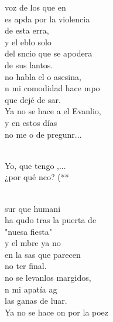 \documentclass[12pt]{article}
\begin{document}
\begin{multicols*}{2}
\begin{cancion}%
	 voz de los que en\\
	es apda por la violencia \\
	de esta erra,\\
	y el eblo solo \\
	del sncio que se apodera \\
	de sus lantos.\\
	no habla el o asesina,\\
	n mi comodidad hace mpo \\
	que dejé de sar.\\
	Ya no se hace a el Evanlio, \\
y en estos días \\
	no me o de pregunr...\\\jump\\
	\begin{chorus}%
	Yo, que tengo ,...  \\
	¿por qué nco? (** \\
	\end{chorus}%
	\jump\\
	 sur que humani\\
	ha qudo tras la puerta de \\
	"nuesa fiesta"\\
	y el mbre ya no \\
	en la sas que parecen \\
	no ter final.\\
	no se levanlos margidos,\\
	n mi apatía ag  \\
	las ganas de luar.\\
	Ya no se hace on por la poez\\

\end{cancion}
\end{multicols*}
\end{document}
